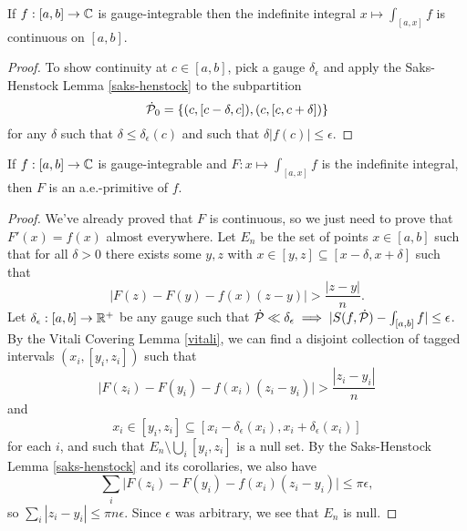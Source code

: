 \begin{cor} If $f : [a,b] \rightarrow \mathbb{C}$ is gauge-integrable then the indefinite integral $x \mapsto \int_{[a,x]} f$ is continuous on $[a,b]$.
\end{cor}
\begin{proof} To show continuity at $c \in [a,b]$, pick a gauge $\delta_\epsilon$ and apply the Saks-Henstock Lemma \ref{saks-henstock} to the subpartition
\[
\dot{\mathcal{P}}_0 = \{(c,[c-\delta,c]),(c,[c,c+\delta])\}
\]
for any $\delta$ such that $\delta \le \delta_\epsilon(c)$ and such that $\delta |f(c)| \le \epsilon$.
\end{proof}

\begin{thm} If $f : [a,b] \rightarrow \mathbb{C}$ is gauge-integrable and $F : x \mapsto \int_{[a,x]} f$ is the indefinite integral, then $F$ is an a.e.-primitive of $f$.
\end{thm}
\begin{proof} We've already proved that $F$ is continuous, so we just need to prove that $F'(x) = f(x)$ almost everywhere. Let $E_n$ be the set of points $x \in [a,b]$ such that for all $\delta > 0$ there exists some $y, z$ with $x \in [y,z] \subseteq [x-\delta,x+\delta]$ such that
\[
\Big|F(z) - F(y) - f(x)(z-y)\Big| > \frac{|z-y|}{n}.
\]
Let $\delta_\epsilon : [a,b] \rightarrow \mathbb{R}^+$ be any gauge such that $\dot{\mathcal{P}} \ll \delta_\epsilon \implies |S(f,\dot{\mathcal{P}}) - \int_{[a,b]}f| \le \epsilon$. By the Vitali Covering Lemma \ref{vitali}, we can find a disjoint collection of tagged intervals $(x_i, [y_i,z_i])$ such that
\[
\Big|F(z_i) - F(y_i) - f(x_i)(z_i-y_i)\Big| > \frac{|z_i-y_i|}{n}
\]
and
\[
x_i \in [y_i,z_i] \subseteq [x_i-\delta_\epsilon(x_i),x_i+\delta_\epsilon(x_i)]
\]
for each $i$, and such that $E_n \setminus \bigcup_i [y_i,z_i]$ is a null set. By the Saks-Henstock Lemma \ref{saks-henstock} and its corollaries, we also have
\[
\sum_i \Big|F(z_i) - F(y_i) - f(x_i)(z_i-y_i)\Big| \le \pi\epsilon,
\]
so $\sum_i |z_i - y_i| \le \pi n\epsilon$. Since $\epsilon$ was arbitrary, we see that $E_n$ is null.
\end{proof}




